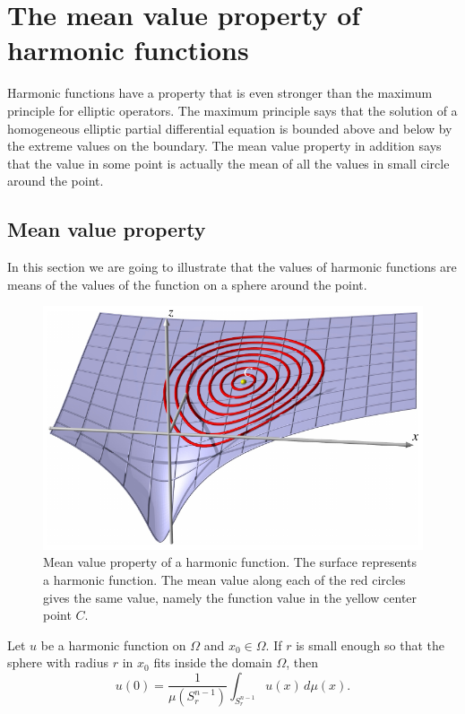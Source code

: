 %
%
%
\section{The mean value property of harmonic functions}
Harmonic functions have a property that is even stronger than
the maximum principle for elliptic operators.
The maximum principle says that the solution of a homogeneous elliptic
partial differential equation is bounded above and below by the
extreme values on the boundary.
The mean value property in addition says that the value in some
point is actually the mean of all the values in small circle
around the point.

\subsection{Mean value property}
In this section we are going to illustrate that the values of harmonic
functions are means of the values of the function on a sphere around 
the point.
\begin{figure}
\centering
\includegraphics{7-elliptic/images/meanvalue.pdf}
\caption{Mean value property of a harmonic function.
The surface represents a harmonic function. 
The mean value along each of the red circles gives the same value,
namely the function value in the yellow center point $C$.
\label{elliptic:meanvalue:image}}
\end{figure}

\begin{satz}
Let $u$ be a harmonic function on $\Omega$ and $x_0\in\Omega$.
If $r$ is small enough so that the sphere with radius $r$ in $x_0$
fits inside the domain $\Omega$,
then
\[
u(0)=\frac1{\mu(S^{n-1}_r)}\int_{S^{n-1}_r}u(x)\,d\mu(x).
\]
\end{satz}

